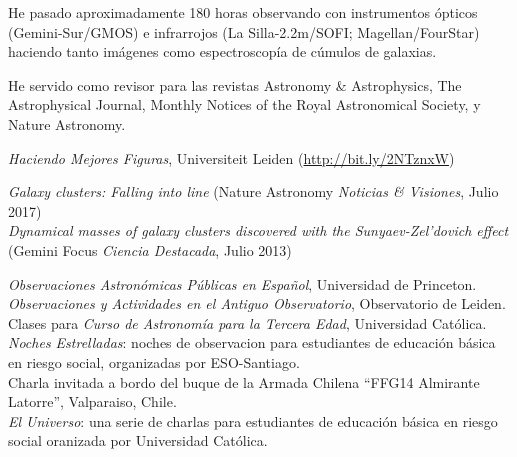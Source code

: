 \documentclass[11pt]{article}
\def\clusters{c\'umulos de galaxias}
\begin{document}
{He pasado aproximadamente 180 horas observando con instrumentos \'opticos (Gemini-Sur/GMOS) e infrarrojos (La Silla-2.2m/SOFI; Magellan/FourStar) haciendo tanto im\'agenes como espectroscop\'ia de \clusters.}


%


\noindent
He servido como revisor para las revistas Astronomy \& Astrophysics, The Astrophysical Journal, Monthly Notices of the Royal Astronomical Society, y Nature Astronomy.


\noindent
{} \emph{Haciendo Mejores Figuras}, Universiteit Leiden (\url{http://bit.ly/2NTznxW})


\noindent
\emph{Galaxy clusters: Falling into line} (Nature Astronomy \emph{Noticias \& Visiones}, Julio 2017)\\
\emph{Dynamical masses of galaxy clusters discovered with the Sunyaev-Zel'dovich effect} (Gemini Focus \emph{Ciencia Destacada}, Julio 2013)


\noindent
{} \emph{Observaciones Astron\'omicas P\'ublicas en Espa\~nol}, Universidad de Princeton.\\
 \emph{Observaciones y Actividades en el Antiguo Observatorio}, Observatorio de Leiden.\\
 Clases para \emph{Curso de Astronom\'ia para la Tercera Edad}, Universidad Cat\'olica.\\
 \emph{Noches Estrelladas}: noches de observacion para estudiantes de educaci\'on b\'asica en riesgo social, organizadas por ESO-Santiago.\\
 Charla invitada a bordo del buque de la Armada Chilena ``FFG14 Almirante Latorre'', Valparaiso, Chile.\\
 \emph{El Universo}: una serie de charlas para estudiantes de educaci\'on b\'asica en riesgo social oranizada por Universidad Cat\'olica.\\
\end{document}
